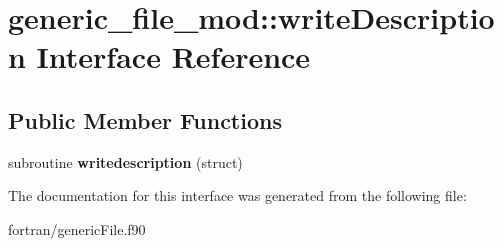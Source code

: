 \hypertarget{interfacegeneric__file__mod_1_1write_description}{}\section{generic\+\_\+file\+\_\+mod\+:\+:write\+Description Interface Reference}
\label{interfacegeneric__file__mod_1_1write_description}
\subsection*{Public Member Functions}
\begin{DoxyCompactItemize}
\item 
\mbox{\label{interfacegeneric__file__mod_1_1write_description_a66c8cb499357bb27c1521aa50bc26c1e}} 
subroutine {\bfseries writedescription} (struct)
\end{DoxyCompactItemize}


The documentation for this interface was generated from the following file\+:\begin{DoxyCompactItemize}
\item 
fortran/generic\+File.\+f90\end{DoxyCompactItemize}
